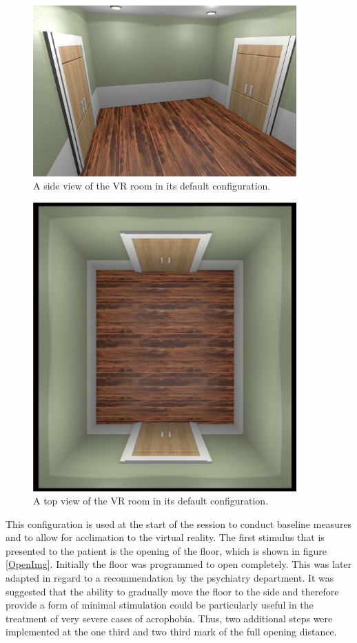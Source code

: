 \begin{figure}[h]
\centering
\includegraphics[width=0.9\textwidth]{images/RoomDefault.png}
\caption{A side view of the VR room in its default configuration.}
\label{VRdefaultImg}
\end{figure}

\begin{figure}[h]
\centering
\includegraphics[width=0.9\textwidth]{images/RoomDefaultTop.png}
\caption{A top view of the VR room in its default configuration.}
\label{VRdefaultTopImg}
\end{figure}

This configuration is used at the start of the session to conduct baseline measures and to allow for acclimation to the virtual reality. The first stimulus that is presented to the patient is the opening of the floor, which is shown in figure \ref{OpenImg}. Initially the floor was programmed to open completely. This was later adapted in regard to a recommendation by the psychiatry department. It was suggested that the ability to gradually move the floor to the side and therefore provide a form of minimal stimulation could be particularly useful in the treatment of very severe cases of acrophobia. Thus, two additional steps were implemented at the one third and two third mark of the full opening distance.

